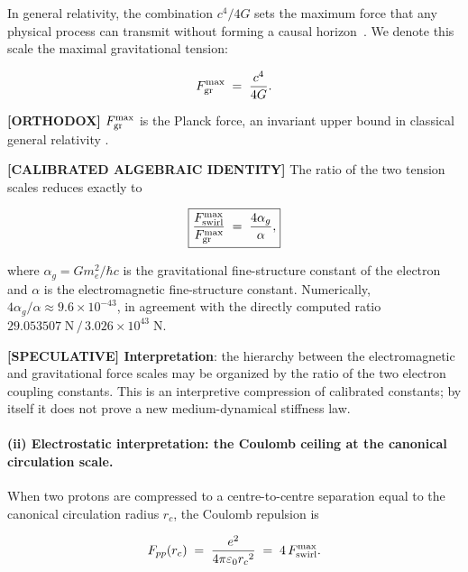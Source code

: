 \documentclass[11pt]{article}
\theoremstyle{definition}
\theoremstyle{plain}
\theoremstyle{remark}
\newcommand{\rc}{{r_c}}
\begin{document}
        In general relativity, the combination $c^4/4G$ sets the maximum force that any physical process can transmit without forming a causal horizon~\cite{Gibbons2002}. We denote this scale the maximal gravitational tension:

        \begin{align}
            F_{\rm gr}^{\max} \;=\; \frac{c^4}{4G}.
            \label{eq:Fgr}
        \end{align}

        \textbf{[ORTHODOX]} $F_{\rm gr}^{\max}$ is the Planck force, an invariant upper bound in classical general relativity \cite{Gibbons2002}.

        \textbf{[CALIBRATED ALGEBRAIC IDENTITY]} The ratio of the two tension scales reduces exactly to

        \begin{align}
            \boxed{
            \frac{F_{\rm swirl}^{\max}}{F_{\rm gr}^{\max}}
            \;=\; \frac{4\alpha_g}{\alpha},
            }
            \label{eq:Fmax_ratio}
        \end{align}

        where $\alpha_g = Gm_e^2/\hbar c$ is the gravitational fine-structure constant of the electron and $\alpha$ is the electromagnetic fine-structure constant. Numerically, $4\alpha_g/\alpha \approx 9.6\times10^{-43}$, in agreement with the directly computed ratio $29.053507\;\text{N}\,/\,3.026\times10^{43}\;\text{N}$.

        \textbf{[SPECULATIVE] Interpretation}: the hierarchy between the electromagnetic and gravitational force scales may be organized by the ratio of the two electron coupling constants. This is an interpretive compression of calibrated constants; by itself it does not prove a new medium-dynamical stiffness law.

        \paragraph{(ii) Electrostatic interpretation: the Coulomb ceiling at the canonical circulation scale.}

        When two protons are compressed to a centre-to-centre separation equal to the canonical circulation radius $\rc$, the Coulomb repulsion is

        \begin{align}
            F_{pp}(\rc)
            \;=\; \frac{e^2}{4\pi\varepsilon_0 \rc^2}
            \;=\; 4\,F_{\rm swirl}^{\max}.
            \label{eq:Coulomb_core}
        \end{align}
\end{document}
